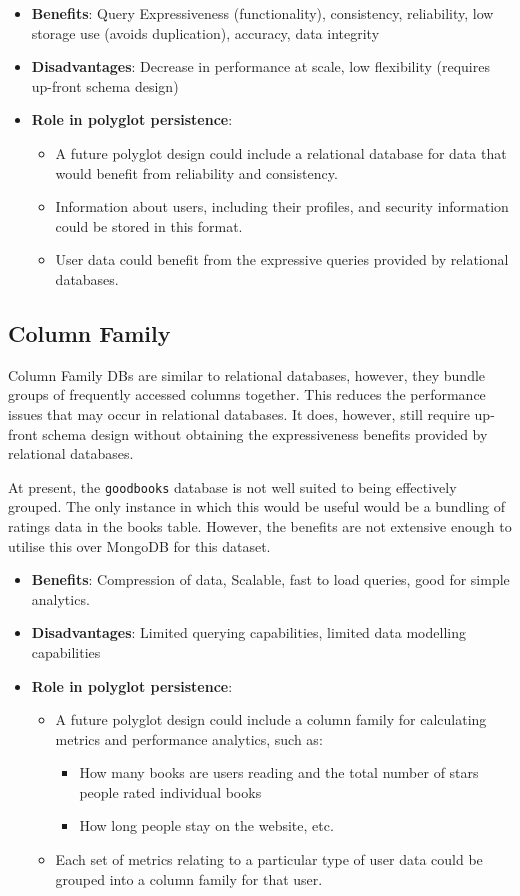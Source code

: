 \documentclass[11pt]{article}
\begin{document}
\begin{itemize}
\item \textbf{Benefits}: Query Expressiveness (functionality), consistency, reliability, low storage use (avoids duplication), accuracy, data integrity
\item \textbf{Disadvantages}: Decrease in performance at scale, low flexibility (requires up-front schema design)
\item \textbf{Role in polyglot persistence}:
\begin{itemize}
\item A future polyglot design could include a relational database for data that would benefit from reliability and consistency.
\item Information about users, including their profiles, and security information could be stored in this format.
\item User data could benefit from the expressive queries provided by relational databases.
\end{itemize}
\end{itemize}
\subsection{Column Family}
\label{sec:org137f617}
Column Family DBs are similar to relational databases, however, they bundle groups of frequently accessed columns together. This reduces the performance issues that may occur in relational databases. It does, however, still require up-front schema design without obtaining the expressiveness benefits provided by relational databases.\\
\linebreak

At present, the \texttt{goodbooks} database is not well suited to being effectively grouped. The only instance in which this would be useful would be a bundling of ratings data in the books table. However, the benefits are not extensive enough to utilise this over MongoDB for this dataset.

\begin{itemize}
\item \textbf{Benefits}: Compression of data, Scalable, fast to load queries, good for simple analytics.
\item \textbf{Disadvantages}: Limited querying capabilities, limited data modelling capabilities
\item \textbf{Role in polyglot persistence}:
\begin{itemize}
\item A future polyglot design could include a column family for calculating metrics and performance analytics, such as:
\begin{itemize}
\item How many books are users reading and the total number of stars people rated individual books
\item How long people stay on the website, etc.
\end{itemize}
\item Each set of metrics relating to a particular type of user data could be grouped into a column family for that user.
\end{itemize}
\end{itemize}
\end{document}
